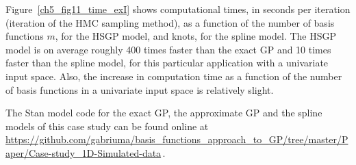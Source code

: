 \documentclass[onecolumn,a4paper,11pt]{article}
\begin{document}
Figure~\ref{ch5_fig11_time_exI} shows computational times, in seconds per iteration (iteration of the HMC sampling method), as a function of the number of basis functions $m$, for the HSGP model, and knots, for the spline model. The HSGP model is on average roughly 400 times faster than the exact GP and 10 times faster than the spline model, for this particular application with a univariate input space. Also, the increase in computation time as a function of the number of basis functions in a univariate input space is relatively slight.

The Stan model code for the exact GP, the approximate GP and the spline models of this case study can be found online at {\small \url{ https://github.com/gabriuma/basis_functions_approach_to_GP/tree/master/Paper/Case-study_1D-Simulated-data}}\,.
%
\end{document}
